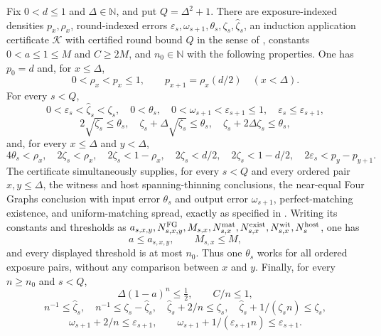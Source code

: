 \begin{lemma}
Fix $0<d\leq1$ and $\Delta\in\mathbb N$, and put $Q=\Delta^2+1$.
There are exposure-indexed densities $p_x,\rho_x$, round-indexed errors
$\varepsilon_s,\omega_{s+1},\theta_s,\zeta_s,\widehat\zeta_s$, an induction
application certificate $\mathcal K$ with certified round bound $Q$ in the
sense of , constants $0<a\leq1\leq M$ and
$C\geq2M$, and $n_0\in\mathbb N$ with the following properties.
One has $p_0=d$ and, for $x\leq\Delta$,
\[
 0<\rho_x<p_x\leq1,\qquad
 p_{x+1}=\rho_x(d/2)\quad(x<\Delta).
\]
For every $s<Q$,
\[
 0<\varepsilon_s<\widehat\zeta_s<\zeta_s,\quad0<\theta_s,\quad
 0<\omega_{s+1}<\varepsilon_{s+1}\leq1,\quad
 \varepsilon_s\leq\varepsilon_{s+1},
\]
\[
 2\sqrt{\zeta_s}\leq\theta_s,\quad
 \zeta_s+\Delta\sqrt{\zeta_s}\leq\theta_s,\quad
 \zeta_s+2\Delta\zeta_s\leq\theta_s,                 \tag{A1}
\]
and, for every $x\leq\Delta$ and $y<\Delta$,
\[
 4\theta_s<\rho_x,\quad 2\zeta_s<\rho_x,\quad
 2\zeta_s<1-\rho_x,\quad 2\zeta_s<d/2,\quad
 2\zeta_s<1-d/2,\quad 2\varepsilon_s<p_y-p_{y+1}.       \tag{A2}
\]
The certificate simultaneously supplies, for every $s<Q$ and every ordered
pair $x,y\leq\Delta$, the witness and host spanning-thinning conclusions,
the near-equal Four Graphs conclusion with input error $\theta_s$ and output
error $\omega_{s+1}$, perfect-matching existence, and uniform-matching
spread, exactly as specified in .
Writing its constants and thresholds as
$a_{s,x,y},N^{\rm FG}_{s,x,y},M_{s,x},N^{\rm mat}_{s,x},
N^{\rm exist}_{s,x},N^{\rm wit}_{s,x},N^{\rm host}_s$, one has
\[
 a\leq a_{s,x,y},\qquad M_{s,x}\leq M,
\]
and every displayed threshold is at most $n_0$.  Thus one $\theta_s$ works
for all ordered exposure pairs, without any comparison between $x$ and $y$.
Finally, for every $n\geq n_0$ and $s<Q$,
\[
 \Delta(1-a)^n\leq\tfrac12,\qquad C/n\leq1,             \tag{A3}
\]
\[
 n^{-1}\leq\widehat\zeta_s,\quad
 n^{-1}\leq\zeta_s-\widehat\zeta_s,\quad
 \widehat\zeta_s+2/n\leq\zeta_s,\quad
 \widehat\zeta_s+1/(\zeta_sn)\leq\zeta_s,             \tag{A4a}
\]
\[
 \omega_{s+1}+2/n\leq\varepsilon_{s+1},\qquad
 \omega_{s+1}+1/(\varepsilon_{s+1}n)\leq\varepsilon_{s+1}. \tag{A4b}
\]
\end{lemma}
